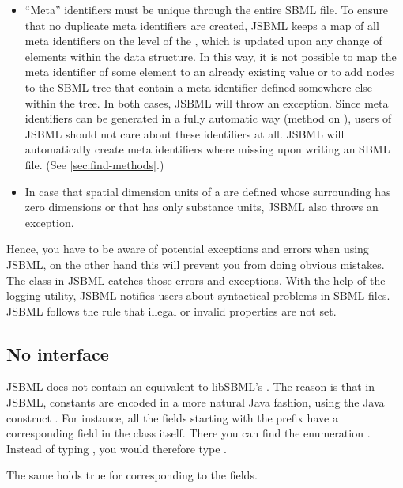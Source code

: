 \begin{itemize}
\item ``Meta'' identifiers must be unique through the entire SBML file. To
  ensure that no duplicate meta identifiers are created, JSBML keeps a map
  of all meta identifiers on the level of the \SBMLDocument, which is
  updated upon any change of elements within the data structure. In this
  way, it is not possible to map the meta identifier of some element to an
  already existing value or to add nodes to the SBML tree that contain a
  meta identifier defined somewhere else within the tree. In both cases,
  JSBML will throw an exception. Since meta identifiers can be generated in
  a fully automatic way (method  on
  ), users of JSBML should not care about these
  identifiers at all. JSBML will automatically create meta identifiers
  where missing upon writing an SBML file.  (See \vref{sec:find-methods}.)

\item In case that spatial dimension units of a \Species{} are defined
  whose surrounding \Compartment{} has zero dimensions or that has only
  substance units, JSBML also throws an exception.

\end{itemize}

Hence, you have to be aware of potential exceptions and errors when using
JSBML,  on the other hand this will prevent you from doing
obvious mistakes. The class \SBMLReader in JSBML catches those errors and
exceptions. With the help of the logging utility, JSBML notifies users
about syntactical problems in SBML files. JSBML follows the rule that
illegal or invalid properties are not set.


\subsection{No interface  }

JSBML does not contain an equivalent to libSBML's
. The reason is that in JSBML, constants are encoded
in a more natural Java fashion, %
using the Java construct . For instance, all the fields starting
with the prefix \ASTTypePrefix{} have a corresponding field in the \ASTNode
class itself. There you can find the enumeration \ASTType.  Instead of typing
, you would therefore type
.

The same holds true for  corresponding to the
%
fields.


